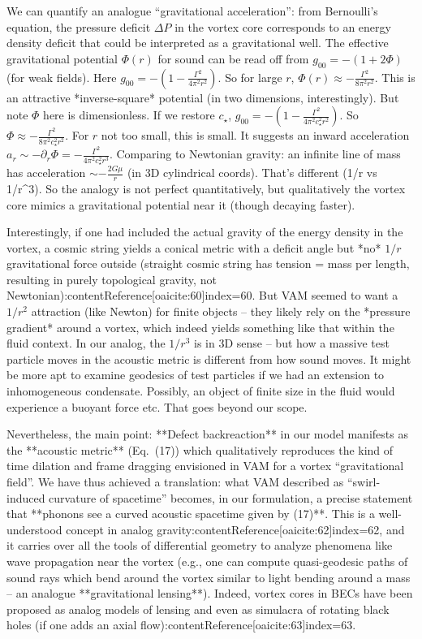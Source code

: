 \documentclass[12pt]{article}
\begin{document}
We can quantify an analogue “gravitational acceleration”: from Bernoulli’s equation, the pressure deficit $\Delta P$ in the vortex core corresponds to an energy density deficit that could be interpreted as a gravitational well. The effective gravitational potential $\Phi(r)$ for sound can be read off from $g_{00} = -(1+2\Phi)$ (for weak fields). Here $g_{00} = -(1 - \frac{\Gamma^2}{4\pi^2r^2})$. So for large $r$, $\Phi(r) \approx -\frac{\Gamma^2}{8\pi^2 r^2}$. This is an attractive *inverse-square* potential (in two dimensions, interestingly). But note $\Phi$ here is dimensionless. If we restore $c_\star$, $g_{00}=-(1 - \frac{\Gamma^2}{4\pi^2 c_\star^2 r^2})$. So $\Phi \approx -\frac{\Gamma^2}{8\pi^2 c_\star^2 r^2}$. For $r$ not too small, this is small. It suggests an inward acceleration $a_r \sim -\partial_r \Phi = -\frac{\Gamma^2}{4\pi^2 c_\star^2 r^3}$. Comparing to Newtonian gravity: an infinite line of mass has acceleration $\sim -\frac{2G\mu}{r}$ (in 3D cylindrical coords). That’s different (1/r vs 1/r^3). So the analogy is not perfect quantitatively, but qualitatively the vortex core mimics a gravitational potential near it (though decaying faster). 

Interestingly, if one had included the actual gravity of the energy density in the vortex, a cosmic string yields a conical metric with a deficit angle but *no* $1/r$ gravitational force outside (straight cosmic string has tension = mass per length, resulting in purely topological gravity, not Newtonian):contentReference[oaicite:60]{index=60}. But VAM seemed to want a $1/r^2$ attraction (like Newton) for finite objects – they likely rely on the *pressure gradient* around a vortex, which indeed yields something like that within the fluid context. In our analog, the $1/r^3$ is in 3D sense – but how a massive test particle moves in the acoustic metric is different from how sound moves. It might be more apt to examine geodesics of test particles if we had an extension to inhomogeneous condensate. Possibly, an object of finite size in the fluid would experience a buoyant force etc. That goes beyond our scope.

Nevertheless, the main point: **Defect backreaction** in our model manifests as the **acoustic metric** (Eq. (17)) which qualitatively reproduces the kind of time dilation and frame dragging envisioned in VAM for a vortex “gravitational field”. We have thus achieved a translation: what VAM described as “swirl-induced curvature of spacetime” becomes, in our formulation, a precise statement that **phonons see a curved acoustic spacetime given by (17)**. This is a well-understood concept in analog gravity:contentReference[oaicite:62]{index=62}, and it carries over all the tools of differential geometry to analyze phenomena like wave propagation near the vortex (e.g., one can compute quasi-geodesic paths of sound rays which bend around the vortex similar to light bending around a mass – an analogue **gravitational lensing**). Indeed, vortex cores in BECs have been proposed as analog models of lensing and even as simulacra of rotating black holes (if one adds an axial flow):contentReference[oaicite:63]{index=63}.
\end{document}
